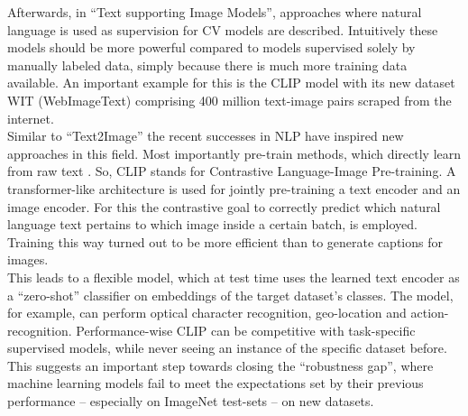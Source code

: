 \documentclass[
]{krantz}
\begin{document}
Afterwards, in ``Text supporting Image Models'', approaches where natural language is used as supervision for CV models are described.
Intuitively these models should be more powerful compared to models supervised solely by manually labeled data, simply because there is much more training data available.
An important example for this is the CLIP model \citep{radford2021learning} with its new dataset WIT (WebImageText) comprising 400 million text-image pairs scraped from the internet.\\
Similar to ``Text2Image'' the recent successes in NLP have inspired new approaches in this field.
Most importantly pre-train methods, which directly learn from raw text \citep[e. g. GPT-n, Generative Pre-trained Transformer;][]{brown2020language}.
So, CLIP stands for Contrastive Language-Image Pre-training.
A transformer-like architecture is used for jointly pre-training a text encoder and an image encoder.
For this the contrastive goal to correctly predict which natural language text pertains to which image inside a certain batch, is employed.
Training this way turned out to be more efficient than to generate captions for images.\\
This leads to a flexible model, which at test time uses the learned text encoder as a ``zero-shot'' classifier on embeddings of the target dataset's classes.
The model, for example, can perform optical character recognition, geo-location and action-recognition.
Performance-wise CLIP can be competitive with task-specific supervised models, while never seeing an instance of the specific dataset before.
This suggests an important step towards closing the ``robustness gap'', where machine learning models fail to meet the expectations set by their previous performance -- especially on ImageNet test-sets -- on new datasets.
\end{document}
